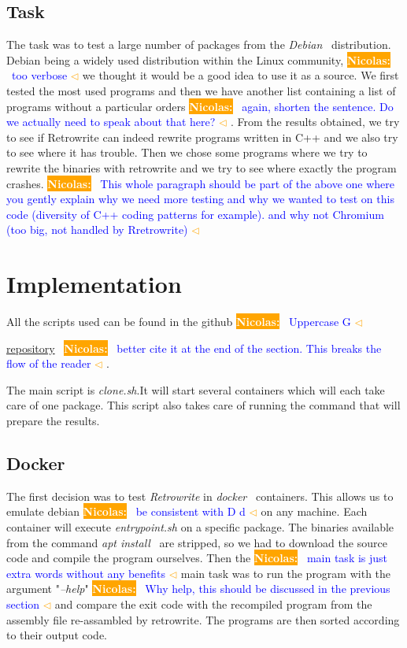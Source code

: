 \documentclass[a4paper,11pt,oneside]{report}
\newcommand{\todobox}[3]{%
	\colorbox{#1}{\textcolor{white}{\sffamily\bfseries\scriptsize #2}}%
	~\textcolor{blue}{#3} %
	\textcolor{#1}{$\triangleleft$}%
}
\newcommand{\nb}[1]{\todobox{orange}{Nicolas:}{#1}}
\begin{document}
\section{Task}
The task was to test a large number of packages from the \textit{Debian}~\cite{debian} distribution.
Debian being a widely used distribution within the Linux community, \nb{too verbose}we thought
it would be a good idea to use it as a source. We first tested the most used
programs and then we have another list containing a list of programs without a
particular orders\nb{again, shorten the sentence. Do we actually need to speak
about that here?}. From the results obtained, we try to see if Retrowrite can
indeed rewrite programs written in C++ and we also try to see where it has
trouble. Then we chose some programs where we try to rewrite the binaries with retrowrite
and we try to see where exactly the program crashes. \nb{This whole paragraph
should be part of the above one where you gently explain why we need more
testing and why we wanted to test on this code (diversity of C++ coding patterns
for example). and why not Chromium (too big, not handled by Rretrowrite)}


\chapter{Implementation}
All the scripts used can be found in the github\nb{Uppercase G} 
\href{https://github.com/ha2san/debian_docker/tree/main/scripts}{repository}~\cite{repo}\nb{better
cite it at the end of the section. This breaks the flow of the reader}.

The main script is \textit{clone.sh}.It will start several containers which will
each take care of one package. This script also takes care of running the
command that will prepare the results.

\section{Docker}
The first decision was to test \textit{Retrowrite} in
\textit{docker}~\cite{merkel2014docker} containers. This allows us to emulate
debian \nb{be consistent with D d } on
any machine. Each container will execute \textit{entrypoint.sh} on a specific package. The
binaries available from the command \textit{apt install}~\cite{apt} are stripped, so
we had to download the source code and compile the program ourselves. Then the
\nb{main task is just extra words without any benefits}main task was to run the
program with the argument "\textit{--help}" \nb{Why help, this should be
discussed in the previous section}and
compare the exit code with the recompiled program from the assembly file
re-assambled by retrowrite. The programs are then sorted according to their
output code.
\end{document}
